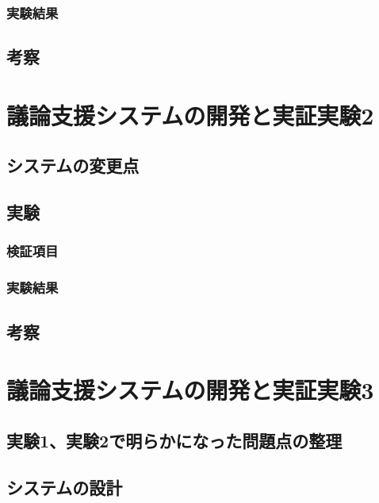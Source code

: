 \documentclass[11pt, a4paper]{jreport} %
\begin{document}
\subsection{実験結果}

\section{考察}



\chapter{議論支援システムの開発と実証実験2}

\section{システムの変更点}

\section{実験}

\subsection{検証項目}

\subsection{実験結果}

\section{考察}



\chapter{議論支援システムの開発と実証実験3}


\section{実験1、実験2で明らかになった問題点の整理}

\section{システムの設計}
\label{sec:システム3}
\end{document}
